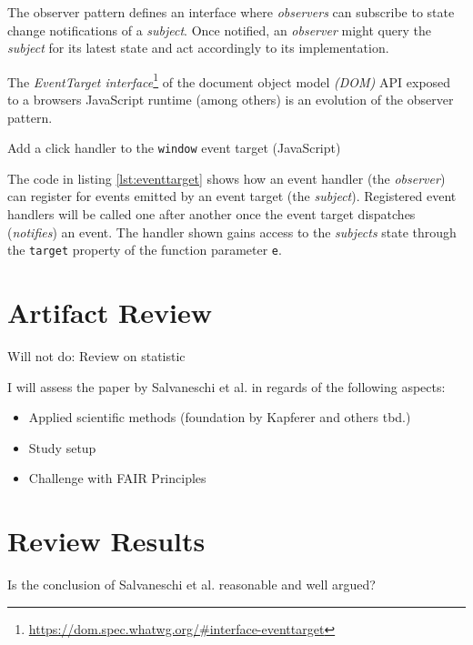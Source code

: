 \documentclass[12pt,a4paper]{article}
\begin{document}
The observer pattern \cite{gamma1995design} defines an interface where \emph{observers} can subscribe to state change notifications of a \emph{subject}. Once notified, an \emph{observer} might query the \emph{subject} for its latest state and act accordingly to its implementation.

The \emph{EventTarget interface}\footnote{\url{https://dom.spec.whatwg.org/\#interface-eventtarget}} of the document object model \emph{(DOM)} API exposed to a browsers JavaScript runtime (among others) is an evolution of the observer pattern.

\begin{listing}[H]
	\caption{Add a click handler to the \texttt{window} event target (JavaScript)}
	\label{lst:eventtarget}
\end{listing}

The code in listing \ref{lst:eventtarget} shows how an event handler (the \emph{observer}) can register for events emitted by an event target (the \emph{subject}). Registered event handlers will be called one after another once the event target dispatches (\emph{notifies}) an event. The handler shown gains access to the \emph{subjects} state through the \texttt{target} property of the function parameter \texttt{e}.


\section{Artifact Review}
Will not do: Review on statistic

I will assess the paper by Salvaneschi et al. \cite{7827078} in regards of the following aspects:
\begin{itemize}
	\item Applied scientific methods (foundation by Kapferer \cite{kapferer:2019:empirical} and others tbd.)
	\item Study setup
	\item Challenge with FAIR Principles \cite{2019arXiv190805986H} \cite{wilkinson:2016}
\end{itemize}



\section{Review Results}
Is the conclusion of Salvaneschi et al. \cite{7827078} reasonable and well argued?
\end{document}
